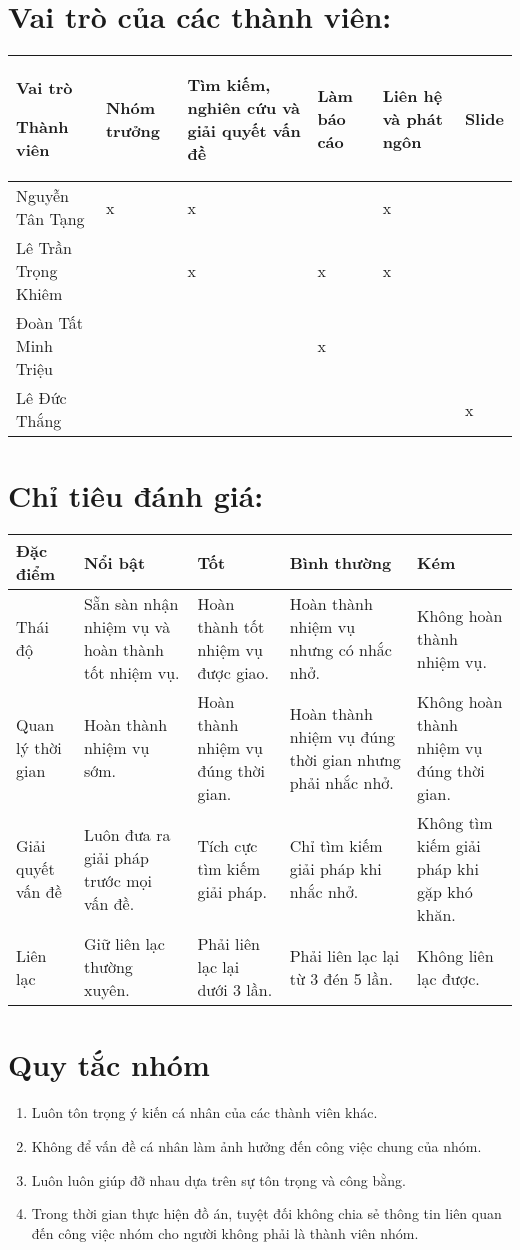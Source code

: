 \documentclass[]{article}
\begin{document}
\section{\texorpdfstring{\textbf{Vai trò của các thành
viên:}}{Vai trò của các thành viên:}}\label{vai-truxf2-cux1ee7a-cuxe1c-thuxe0nh-viuxean}

\begin{longtable}[]{@{}llllll@{}}
\toprule
Vai trò

Thành viên & Nhóm trưởng & Tìm kiếm, nghiên cứu và giải quyết vấn đề &
Làm báo cáo & Liên hệ và phát ngôn & Slide\tabularnewline
\midrule
\endhead
Nguyễn Tân Tạng & x & x & & x &\tabularnewline
Lê Trần Trọng Khiêm & & x & x & x &\tabularnewline
Đoàn Tất Minh Triệu & & & x & &\tabularnewline
Lê Đức Thắng & & & & & x\tabularnewline
\bottomrule
\end{longtable}

\section{\texorpdfstring{\textbf{Chỉ tiêu đánh
giá:}}{Chỉ tiêu đánh giá:}}\label{chux1ec9-tiuxeau-ux111uxe1nh-giuxe1}

\begin{longtable}[]{@{}lllll@{}}
\toprule
Đặc điểm & Nổi bật & Tốt & Bình thường & Kém\tabularnewline
\midrule
\endhead
Thái độ & Sẵn sàn nhận nhiệm vụ và hoàn thành tốt nhiệm vụ. & Hoàn thành
tốt nhiệm vụ được giao. & Hoàn thành nhiệm vụ nhưng có nhắc nhở. & Không
hoàn thành nhiệm vụ.\tabularnewline
Quan lý thời gian & Hoàn thành nhiệm vụ sớm. & Hoàn thành nhiệm vụ đúng
thời gian. & Hoàn thành nhiệm vụ đúng thời gian nhưng phải nhắc nhở. &
Không hoàn thành nhiệm vụ đúng thời gian.\tabularnewline
Giải quyết vấn đề & Luôn đưa ra giải pháp trước mọi vấn đề. & Tích cực
tìm kiếm giải pháp. & Chỉ tìm kiếm giải pháp khi nhắc nhở. & Không tìm
kiếm giải pháp khi gặp khó khăn.\tabularnewline
Liên lạc & Giữ liên lạc thường xuyên. & Phải liên lạc lại dưới 3 lần. &
Phải liên lạc lại từ 3 đén 5 lần. & Không liên lạc được.\tabularnewline
\bottomrule
\end{longtable}

\section{\texorpdfstring{\textbf{Quy tắc
nhóm}}{Quy tắc nhóm}}\label{quy-tux1eafc-nhuxf3m}

\begin{enumerate}
\def\labelenumi{\arabic{enumi}.}
\item
  Luôn tôn trọng ý kiến cá nhân của các thành viên khác.
\item
  Không để vấn đề cá nhân làm ảnh hưởng đến công việc chung của nhóm.
\item
  Luôn luôn giúp đỡ nhau dựa trên sự tôn trọng và công bằng.
\item
  Trong thời gian thực hiện đồ án, tuyệt đối không chia sẻ thông tin
  liên quan đến công việc nhóm cho người không phải là thành viên nhóm.
\end{enumerate}
\end{document}
